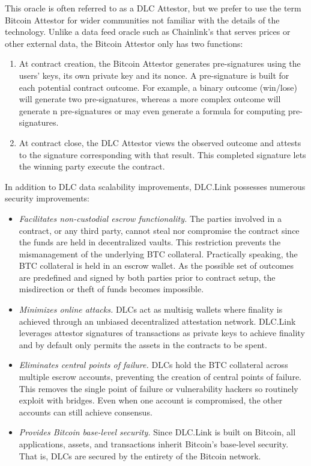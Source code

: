 \documentclass[twoside, a4paper, 11pt]{article}
\begin{document}
  This oracle is often referred to as a DLC Attestor, but we prefer to use the term Bitcoin Attestor for wider communities not familiar with the details of the technology. Unlike a data feed oracle such as Chainlink’s that serves prices or other external data, the Bitcoin Attestor only has two functions:

  \begin{enumerate}
    \item At contract creation, the Bitcoin Attestor generates pre-signatures using the users’ keys, its own private key and its nonce. A pre-signature is built for each potential contract outcome. For example, a binary outcome (win/lose) will generate two pre-signatures, whereas a more complex outcome will generate n pre-signatures or may even generate a formula for computing pre-signatures.
    \item At contract close, the DLC Attestor views the observed outcome and attests to the signature corresponding with that result. This completed signature lets the winning party execute the contract.
  \end{enumerate}

  In addition to DLC data scalability improvements, DLC.Link possesses numerous security improvements:
  \begin{itemize}
    \item \emph{Facilitates non-custodial escrow functionality.} The parties involved in a contract, or any third party, cannot steal nor compromise the contract since the funds are held in decentralized vaults. This restriction prevents the mismanagement of the underlying BTC collateral. Practically speaking, the BTC collateral is held in an escrow wallet. As the possible set of outcomes are predefined and signed by both parties prior to contract setup, the misdirection or theft of funds becomes impossible.
    \item \emph{Minimizes online attacks.} DLCs act as multisig wallets where finality is achieved through an unbiased decentralized attestation network. DLC.Link leverages attestor signatures of transactions as private keys to achieve finality and by default only permits the assets in the contracts to be spent.
    \item \emph{Eliminates central points of failure.} DLCs hold the BTC collateral across multiple escrow accounts, preventing the creation of central points of failure. This removes the single point of failure or vulnerability hackers so routinely exploit with bridges. Even when one account is compromised, the other accounts can still achieve consensus.
    \item  \emph{Provides Bitcoin base-level security.} Since DLC.Link is built on Bitcoin, all applications, assets, and transactions inherit Bitcoin’s base-level security. That is, DLCs are secured by the entirety of the Bitcoin network.
  \end{itemize}
\end{document}
